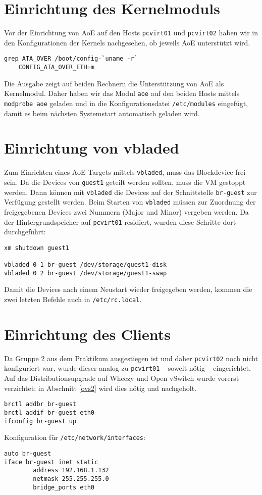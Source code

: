 \section{Einrichtung des Kernelmoduls}
Vor der Einrichtung von AoE auf den Hosts \verb#pcvirt01# und \verb#pcvirt02# haben wir in den Konfigurationen der Kernels nachgesehen, ob jeweils AoE unterstützt wird. 
\setupVerbatimOut
\begin{verbatim}
grep ATA_OVER /boot/config-`uname -r`
    CONFIG_ATA_OVER_ETH=m
\end{verbatim} 
Die Ausgabe zeigt auf beiden Rechnern die Unterstützung von AoE als Kernelmodul. Daher haben wir das Modul \verb#aoe# auf den beiden Hosts mittels \verb#modprobe aoe# geladen und in die Konfigurationsdatei \verb#/etc/modules# eingefügt, damit es beim nächsten Systemstart automatisch geladen wird. 

\section{Einrichtung von vbladed}
Zum Einrichten eines AoE-Targets mittels \verb#vbladed#, muss das Blockdevice frei sein. Da die Devices von \verb#guest1# geteilt werden sollten, muss die VM gestoppt werden. Dann können mit \verb#vbladed# die Devices auf der Schnittstelle \verb#br-guest# zur Verfügung gestellt werden. Beim Starten von \verb#vbladed# müssen zur Zuordnung der freigegebenen Devices zwei Nummern (Major und Minor) vergeben werden. Da der Hintergrundspeicher auf \verb#pcvirt01# residiert, wurden diese Schritte dort durchgeführt:
\setupVerbatimOut
\begin{verbatim}
xm shutdown guest1

vbladed 0 1 br-guest /dev/storage/guest1-disk  
vbladed 0 2 br-guest /dev/storage/guest1-swap
\end{verbatim}
Damit die Devices nach einem Neustart wieder freigegeben werden, kommen die zwei letzten Befehle auch in \verb#/etc/rc.local#. 
\section{Einrichtung des Clients}
Da Gruppe 2 aus dem Praktikum ausgestiegen ist und daher \verb#pcvirt02# noch nicht konfiguriert war, wurde dieser analog zu \verb#pcvirt01#  -- soweit nötig -- eingerichtet. Auf das Distributionsupgrade auf Wheezy und Open vSwitch wurde vorerst verzichtet; in Abschnitt \ref{ovs2} wird dies nötig und nachgeholt.
\begin{verbatim}
brctl addbr br-guest
brctl addif br-guest eth0
ifconfig br-guest up
\end{verbatim}
Konfiguration für \verb#/etc/network/interfaces#:
\setupVerbatimOut
\begin{verbatim}
auto br-guest
iface br-guest inet static
        address 192.168.1.132
        netmask 255.255.255.0
        bridge_ports eth0
\end{verbatim}

